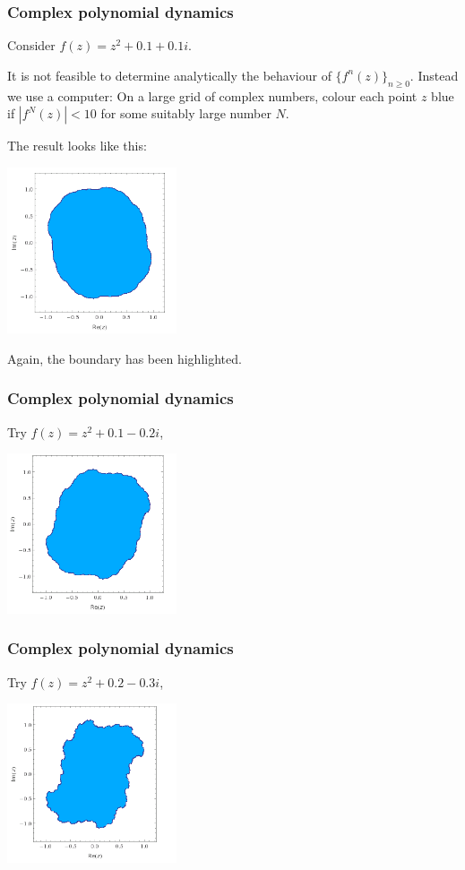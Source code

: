 \documentclass{beamer} %
\theoremstyle{definition} %
\begin{document}
\begin{frame}\frametitle{Complex polynomial dynamics}
    Consider $f(z) = z^2+0.1+0.1i$. 
    
    It is not feasible to determine analytically the behaviour of $\{f^n(z)\}_{n\geq 0}$.
    Instead we use a computer: On a large grid of complex numbers, colour each point $z$
    blue if $|f^N(z)| < 10$ for some suitably large number $N$.
    
    The result looks like this:
    \begin{center}
        \includegraphics[width=50mm]{img/julia0101-filled.png}
    \end{center}
    Again, the boundary has been highlighted.
\end{frame}

\begin{frame}\frametitle{Complex polynomial dynamics}
    Try $f(z) = z^2+0.1-0.2i$,\\
    \begin{center}
        \includegraphics[width=50mm]{img/julia01-02-filled.png}
    \end{center}
\end{frame}

\begin{frame}\frametitle{Complex polynomial dynamics}
    Try $f(z) = z^2+0.2-0.3i$,\\
    \begin{center}
        \includegraphics[width=50mm]{img/julia02-03-filled.png}
    \end{center}
\end{frame}
\end{document}
